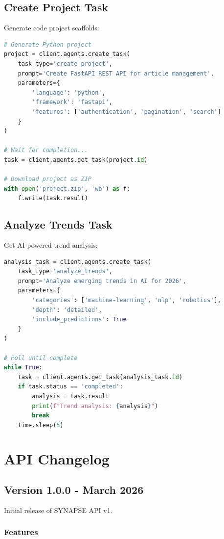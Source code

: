 \documentclass{report}
\begin{document}
\section{Create Project Task}

Generate code project scaffolds:

\begin{lstlisting}[language=Python]
# Generate Python project
project = client.agents.create_task(
    task_type='create_project',
    prompt='Create FastAPI REST API for article management',
    parameters={
        'language': 'python',
        'framework': 'fastapi',
        'features': ['authentication', 'pagination', 'search']
    }
)

# Wait for completion...
task = client.agents.get_task(project.id)

# Download project as ZIP
with open('project.zip', 'wb') as f:
    f.write(task.result)
\end{lstlisting}

\section{Analyze Trends Task}

Get AI-powered trend analysis:

\begin{lstlisting}[language=Python]
analysis_task = client.agents.create_task(
    task_type='analyze_trends',
    prompt='Analyze emerging trends in AI for 2026',
    parameters={
        'categories': ['machine-learning', 'nlp', 'robotics'],
        'depth': 'detailed',
        'include_predictions': True
    }
)

# Poll until complete
while True:
    task = client.agents.get_task(analysis_task.id)
    if task.status == 'completed':
        analysis = task.result
        print(f"Trend analysis: {analysis}")
        break
    time.sleep(5)
\end{lstlisting}

\chapter{API Changelog}

\section{Version 1.0.0 - March 2026}

Initial release of SYNAPSE API v1.

\subsection{Features}
\end{document}
